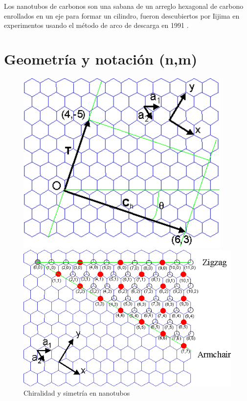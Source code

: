 \newpage

Los nanotubos de carbonos son una sabana de un arreglo hexagonal de carbono enrollados en un eje para formar un cilindro, fueron descubiertos por Iijima en experimentos usando el método de arco de descarga en 1991 \cite{Iijima1991}.\\

\section{Geometría y notación (n,m)}

\begin{figure}[!h] 
    \centering
    \begin{minipage}{0.45\textwidth}
    \centering
    \includegraphics[width=0.95\textwidth]{ChCNT.png}
    \end{minipage}
    \begin{minipage}{0.45\textwidth}
    \centering
    \includegraphics[width=1.2\textwidth]{NT.png}
    \end{minipage}
    \caption{Chiralidad y simetría en nanotubos \cite{ShigeoChiral}}
\end{figure} \label{fig:GeoVectChir}

